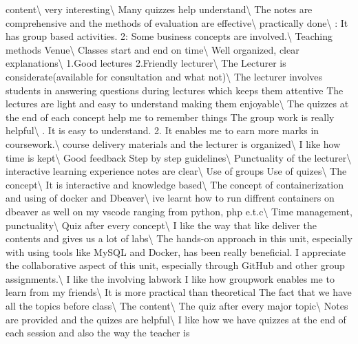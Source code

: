 \documentclass[
]{article}
\begin{document}
content\textbackslash{} \hline very interesting\textbackslash{} \hline
Many quizzes help understand\textbackslash{} \hline The notes are
comprehensive and the methods of evaluation are
effective\textbackslash{} \hline practically done\textbackslash{} : It has group based activities. 2: Some business concepts are
involved.\textbackslash{} \hline Teaching methods Venue\textbackslash{}
\hline Classes start and end on time\textbackslash{} \hline Well
organized, clear explanations\textbackslash{} \hline 1.Good lectures
2.Friendly lecturer\textbackslash{} \hline The Lecturer is
considerate(available for consultation and what not)\textbackslash{}
\hline The lecturer involves students in answering questions during
lectures which keeps them attentive The lectures are light and easy to
understand making them enjoyable\textbackslash{} \hline The quizzes at
the end of each concept help me to remember things The group work is
really helpful\textbackslash{} . It is easy to understand. 2. It enables me to earn more marks in
coursework.\textbackslash{} \hline course delivery materials and the
lecturer is organized\textbackslash{} \hline I like how time is
kept\textbackslash{} \hline Good feedback Step by step
guidelines\textbackslash{} \hline Punctuality of the
lecturer\textbackslash{} \hline interactive learning experience notes
are clear\textbackslash{} \hline Use of groups Use of
quizes\textbackslash{} \hline The concept\textbackslash{} \hline It is
interactive and knowledge based\textbackslash{} \hline The concept of
containerization and using of docker and Dbeaver\textbackslash{} \hline
ive learnt how to run diffrent containers on dbeaver as well on my
vscode ranging from python, php e.t.c\textbackslash{} \hline Time
management, punctuality\textbackslash{} \hline Quiz after every
concept\textbackslash{} \hline I like the way that like deliver the
contents and gives us a lot of labs\textbackslash{} \hline The hands-on
approach in this unit, especially with using tools like MySQL and
Docker, has been really beneficial. I appreciate the collaborative
aspect of this unit, especially through GitHub and other group
assignments.\textbackslash{} \hline I like the involving labwork I like
how groupwork enables me to learn from my friends\textbackslash{} \hline
It is more practical than theoretical The fact that we have all the
topics before class\textbackslash{} \hline The content\textbackslash{}
\hline The quiz after every major topic\textbackslash{} \hline Notes are
provided and the quizes are helpful\textbackslash{} \hline I like how we
have quizzes at the end of each session and also the way the teacher is
\end{document}
